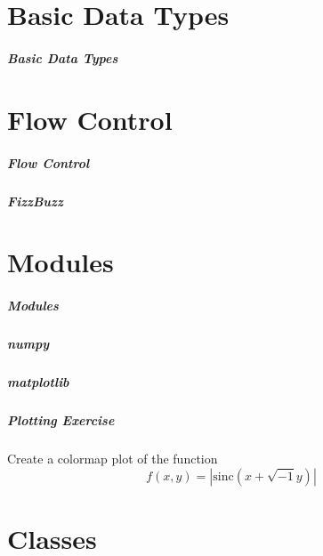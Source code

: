 \documentclass[hyperref={colorlinks, linkcolor=blue, urlcolor=blue}]{beamer}
\begin{document}
\part{Basic Data Types} 

\begin{frame}
  \frametitle{Basic Data Types}
\end{frame}

\part{Flow Control} 

\begin{frame}
  \frametitle{Flow Control}
\end{frame}

\begin{frame}
  \frametitle{FizzBuzz}
\end{frame}


\part{Modules} 

\begin{frame}
  \frametitle{Modules}
\end{frame}

\begin{frame}
  \frametitle{numpy}
\end{frame}

\begin{frame}
  \frametitle{matplotlib}
\end{frame}

\begin{frame}
  \frametitle{Plotting Exercise}
  Create a colormap plot of the function
  \[ f(x,y) = |\mathrm{sinc}(x+\sqrt{-1}y)| \]
\end{frame}


\part{Classes} 
\end{document}
